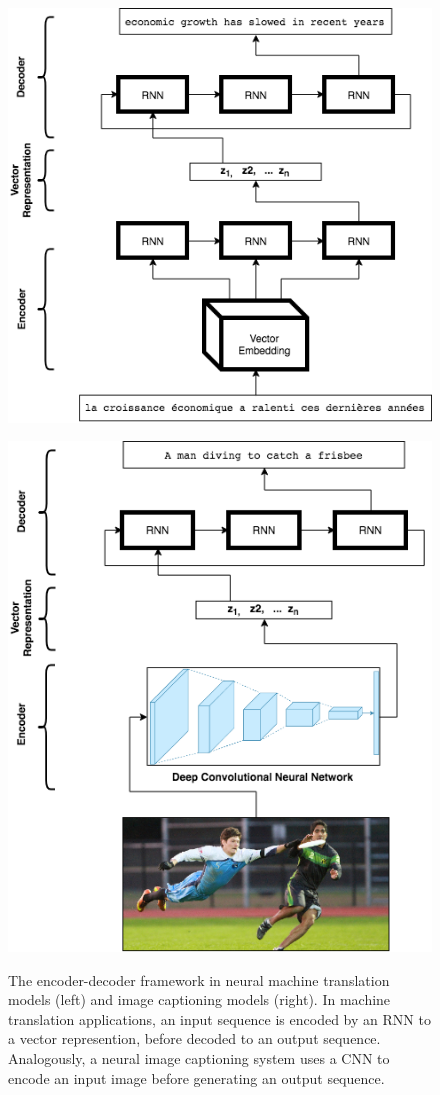 \documentclass[letterpaper, 10 pt, conference]{ieeeconf}
\begin{document}
\begin{figure}[h]
\centering
\begin{minipage}{.5\textwidth}
  \centering
  \includegraphics[width=.65\linewidth]{encoder_decoder_trans}
  \label{fig:test1}
\end{minipage}%
\begin{minipage}{.5\textwidth}
  \centering
  \includegraphics[width=.65\linewidth]{encoder_decoder_cnn}
  \label{fig:test2}
\end{minipage}
\caption{The encoder-decoder framework in neural machine translation models (left) and image captioning models (right). In machine translation applications, an input sequence is encoded by an RNN to a vector represention, before decoded to an output sequence. Analogously, a neural image captioning system uses a CNN to encode an input image before generating an output sequence.}
\end{figure}
\end{document}
